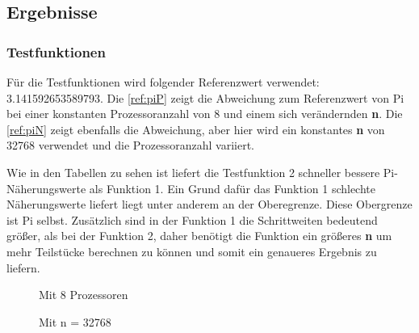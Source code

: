 \subsection{Ergebnisse}
\label{ref:ergebnisse}

\subsubsection{Testfunktionen}

Für die Testfunktionen wird folgender Referenzwert verwendet: 3.141592653589793.
Die \autoref{ref:piP} zeigt die Abweichung zum Referenzwert von Pi bei einer konstanten Prozessoranzahl von 8 und einem sich verändernden \textbf{n}.
Die \autoref{ref:piN} zeigt ebenfalls die Abweichung, aber hier wird ein konstantes \textbf{n} von 32768 verwendet und die Prozessoranzahl variiert.

Wie in den Tabellen zu sehen ist liefert die Testfunktion 2 schneller bessere Pi-Näherungswerte als Funktion 1.
Ein Grund dafür das Funktion 1 schlechte Näherungswerte liefert liegt unter anderem an der Oberegrenze.
Diese Obergrenze ist Pi selbst.
Zusätzlich sind in der Funktion 1 die Schrittweiten bedeutend größer, als bei der Funktion 2, daher benötigt die Funktion ein größeres \textbf{n} um mehr Teilstücke berechnen zu können und somit ein genaueres Ergebnis zu liefern.


\begin{figure}[h]
\begin{minipage}{0.45\textwidth}
	\caption{Mit 8 Prozessoren}
	\label{ref:piP}
\end{minipage}
\hfill
\begin{minipage}{0.45\textwidth}
	\caption{Mit n = 32768}
	\label{ref:piN}
\end{minipage}
\end{figure}



